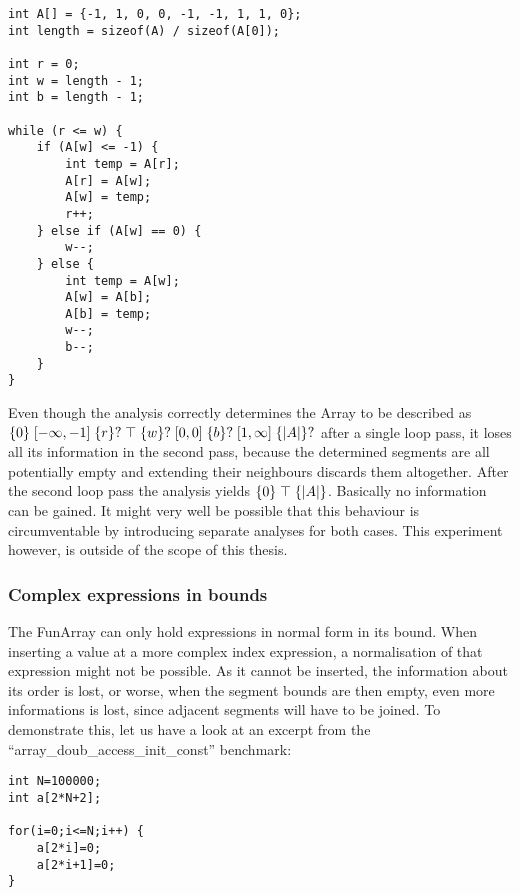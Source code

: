 \vspace{2mm}
\begin{adjustbox}{center}
\begin{lstlisting}
int A[] = {-1, 1, 0, 0, -1, -1, 1, 1, 0};
int length = sizeof(A) / sizeof(A[0]);

int r = 0;
int w = length - 1;
int b = length - 1;

while (r <= w) {
    if (A[w] <= -1) {
        int temp = A[r];
        A[r] = A[w];
        A[w] = temp;
        r++;
    } else if (A[w] == 0) {
        w--;
    } else {
        int temp = A[w];
        A[w] = A[b];
        A[b] = temp;
        w--;
        b--;
    }
}
\end{lstlisting}
\end{adjustbox}
\vspace{2mm}
 
\noindent Even though the analysis correctly determines the Array to be described as $\{0\} \;[-\infty, -1]\; \{r\}? \;\top\; \{w\}? \;[0, 0]\; \{b\}? \;[1, \infty]\;  \{|A|\}?$ after a single loop pass, it loses all its information in the second pass, because the determined segments are all potentially empty and extending their neighbours discards them altogether. After the second loop pass the analysis yields $\{0\} \;\top\; \{|A|\}$. Basically no information can be gained. It might very well be possible that this behaviour is circumventable by introducing separate analyses for both cases. This experiment however, is outside of the scope of this thesis.
 
\subsubsection{Complex expressions in bounds}

The FunArray can only hold expressions in normal form in its bound. When inserting a value at a more complex index expression, a normalisation of that expression might not be possible. As it cannot be inserted, the information about its order is lost, or worse, when the segment bounds are then empty, even more informations is lost, since adjacent segments will have to be joined. To demonstrate this, let us have a look at an excerpt from the ``array\_doub\_access\_init\_\allowbreak{}const'' benchmark:


\begin{adjustbox}{center}
\begin{lstlisting}
int N=100000;
int a[2*N+2];

for(i=0;i<=N;i++) {
    a[2*i]=0;
    a[2*i+1]=0;
}
\end{lstlisting}
\end{adjustbox}
\vspace{2mm}

